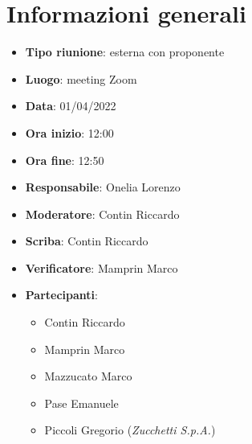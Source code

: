 \section{Informazioni generali}
\begin{itemize}
  \item \textbf{Tipo riunione}: esterna con proponente
  \item \textbf{Luogo}: meeting Zoom
  \item \textbf{Data}: 01/04/2022
  \item \textbf{Ora inizio}: 12:00
  \item \textbf{Ora fine}: 12:50
  \item \textbf{Responsabile}: Onelia Lorenzo
  \item \textbf{Moderatore}: Contin Riccardo
  \item \textbf{Scriba}: Contin Riccardo
  \item \textbf{Verificatore}: Mamprin Marco
  \item \textbf{Partecipanti}:
  \begin{itemize}
    \item Contin Riccardo
    \item Mamprin Marco
    \item Mazzucato Marco
    \item Pase Emanuele
    \item Piccoli Gregorio (\textit{Zucchetti S.p.A.})
  \end{itemize}
\end{itemize}
